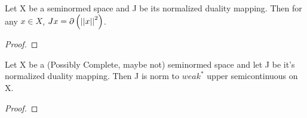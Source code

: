 \begin{thm}[Asplund] \cite{asplund67}
    \label{thm:asplund}
    Let X be a seminormed space and J be its normalized duality mapping. Then for any $x \in X$, $Jx = \partial \left( \left|\left| x \right|\right|^2\right)$.
    \begin{proof}
    \end{proof}
\end{thm} 
\begin{prop} Let X be a (Possibly Complete, maybe not) seminormed space and let J be it's normalized duality mapping. Then J is norm to $weak^*$ upper semicontinuous on X. 
    \begin{proof}
    \end{proof}
\end{prop} 
